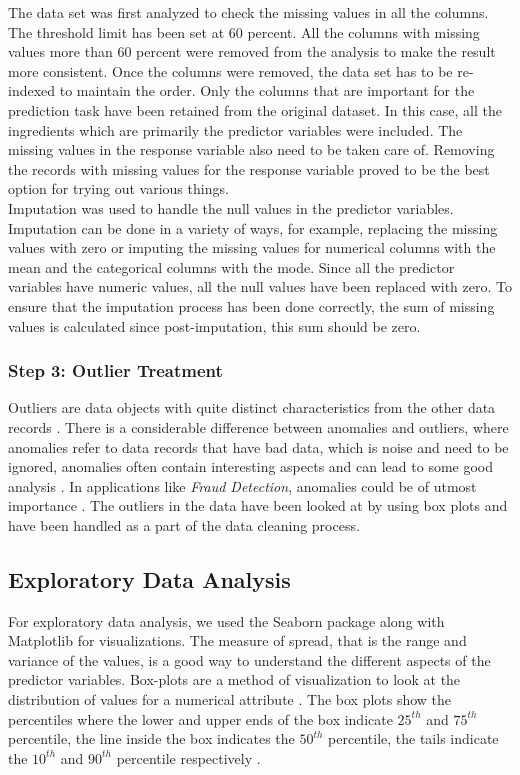 \documentclass[sigconf]{acmart}
\begin{document}
The data set was first analyzed to check the missing values in all the columns. The threshold limit has been set at 60 percent. All the columns with missing values more than 60 percent were removed from the analysis to make the result more consistent. Once the columns were removed, the data set has to be re-indexed to maintain the order. Only the columns that are important for the prediction task have been retained from the original dataset. In this case, all the ingredients which are primarily the predictor variables were included. The missing values in the response variable also need to be taken care of. Removing the records with missing values for the response variable proved to be the best option for trying out various things. \\

Imputation was used to handle the null values in the predictor variables. Imputation can be done in a variety of ways, for example, replacing the missing values with zero or imputing the missing values for numerical columns with the mean and the categorical columns with the mode. Since all the predictor variables have numeric values, all the null values have been replaced with zero. To ensure that the imputation process has been done correctly, the sum of missing values is calculated since post-imputation, this sum should be zero.

\subsubsection{Step 3: Outlier Treatment}
Outliers are data objects with quite distinct characteristics from the other data records \cite{book-tan}. There is a considerable difference between anomalies and outliers, where anomalies refer to data records that have bad data, which is noise and need to be ignored, anomalies often contain interesting aspects and can lead to some good analysis \cite{book-tan}. In applications like {\em Fraud Detection}, anomalies could be of utmost importance \cite{book-tan}. The outliers in the data have been looked at by using box plots and have been handled as a part of the data cleaning process.

\subsection{Exploratory Data Analysis}
For exploratory data analysis, we used the Seaborn package along with Matplotlib for visualizations. The measure of spread, that is the range and variance of the values, is a good way to understand the different aspects of the predictor variables. Box-plots are a method of visualization to look at the distribution of values for a numerical attribute \cite{book-tan}. The box plots show the percentiles where the lower and upper ends of the box indicate $25^{th}$ and $75^{th}$ percentile, the line inside the box indicates the $50^{th}$ percentile, the tails indicate the $10^{th}$ and $90^{th}$ percentile respectively \cite{book-tan}. \\
\end{document}
